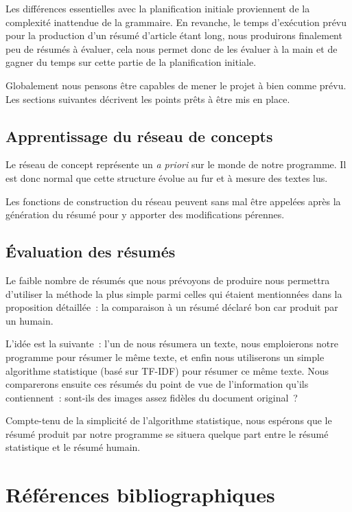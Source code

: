 \documentclass[a4paper, 12pt]{article}
\begin{document}
Les différences essentielles avec la planification initiale proviennent de la complexité inattendue de la grammaire. En revanche, le temps d'exécution prévu pour la production d'un résumé d'article étant long, nous produirons finalement peu de résumés à évaluer, cela nous permet donc de les évaluer à la main et de gagner du temps sur cette partie de la planification initiale.

Globalement nous pensons être capables de mener le projet à bien comme prévu. Les sections suivantes décrivent les points prêts à être mis en place.

\subsection{Apprentissage du réseau de concepts}
Le réseau de concept représente un \textit{a priori} sur le monde de notre programme. Il est donc normal que cette structure évolue au fur et à mesure des textes lus.

Les fonctions de construction du réseau peuvent sans mal être appelées après la génération du résumé pour y apporter des modifications pérennes.

\subsection{\'Evaluation des résumés}
Le faible nombre de résumés que nous prévoyons de produire nous permettra d'utiliser la méthode la plus simple parmi celles qui étaient mentionnées dans la proposition détaillée~: la comparaison à un résumé déclaré bon car produit par un humain.

L'idée est la suivante~: l'un de nous résumera un texte, nous emploierons notre programme pour résumer le même texte, et enfin nous utiliserons un simple algorithme statistique (basé sur TF-IDF) pour résumer ce même texte. Nous comparerons ensuite ces résumés du point de vue de l'information qu'ils contiennent~: sont-ils des images assez fidèles du document original~?

Compte-tenu de la simplicité de l'algorithme statistique, nous espérons que le résumé produit par notre programme se situera quelque part entre le résumé statistique et le résumé humain.

\section{Références bibliographiques}

\nocite{*}
\printbibliography{}

\appendix

\printindex
\end{document}
